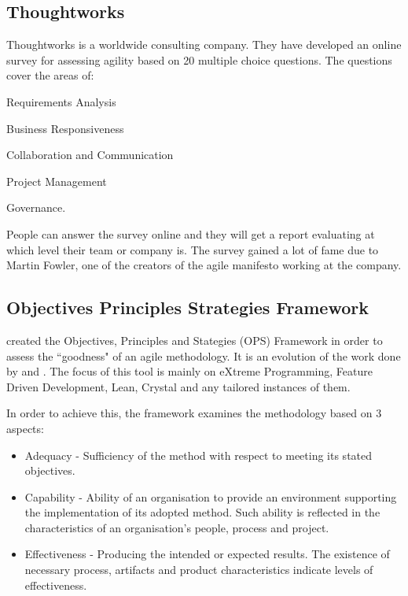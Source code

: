 \subsection{Thoughtworks} %
Thoughtworks \cite{thoughtworks} is a worldwide consulting company. They have developed an online survey for assessing agility based on 20 multiple choice questions. The questions cover the areas of: 
\begin{inparaenum} [a\upshape)]
	\item Requirements Analysis
	\item Business Responsiveness
	\item Collaboration and Communication
	\item Project Management
	\item Governance.
\end{inparaenum}
People can answer the survey online and they will get a report evaluating at which level their team or company is. The survey gained a lot of fame due to Martin Fowler, one of the creators of the agile manifesto working at the company.

\subsection{Objectives Principles Strategies Framework}
\label{subsec:ops}
\citet{sventha_dissertation} created the Objectives, Principles and Stategies (\ac{OPS}) Framework in order to assess the ``goodness" of an agile methodology. It is an evolution of the work done by \citet{2604} and \citet{sidky_dissertation}. The focus of this tool is mainly on eXtreme Programming, Feature Driven Development, Lean, Crystal and any tailored instances of them.

In order to achieve this, the framework examines the methodology based on 3 aspects:
\begin{itemize}
\item Adequacy - Sufficiency of the method with respect to meeting its stated objectives.
\item Capability - Ability of an organisation to provide an environment supporting the implementation of its adopted method. Such ability is reflected in the characteristics of an organisation's people, process
and project.
\item Effectiveness - Producing the intended or expected results. The existence of necessary process, artifacts and product characteristics indicate levels of effectiveness.
\end{itemize}


